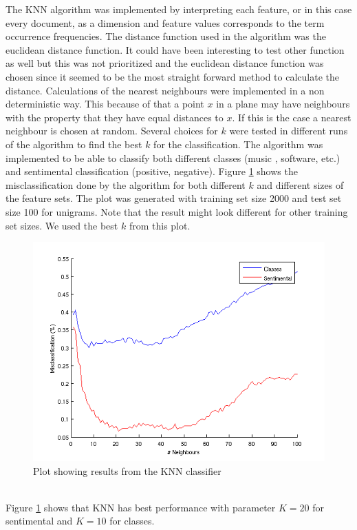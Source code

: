 The KNN algorithm was implemented by interpreting each feature, or in this case
every document, as a dimension and feature values corresponds to the term
occurrence frequencies. The distance function used in the algorithm was the
euclidean distance function. It could have been interesting to test other
function as well but this was not prioritized and the euclidean distance function
was chosen since it seemed to be the most straight forward method to calculate
the distance. Calculations
of the nearest neighbours were implemented in a non deterministic way. This
because of that a point $x$ in a plane may have neighbours with the property
that they have equal distances to $x$. If this is the case a nearest neighbour
is chosen at random. Several choices for $k$ were tested in different runs of
the algorithm to find the best $k$ for the classification. The algorithm was
implemented to be able to classify both different classes (music , software,
etc.) and sentimental classification (positive, negative). Figure
\ref{fig:KNNplot} shows the misclassification done by the algorithm for both
different $k$ and different sizes of the feature sets. The plot was generated
with training set size 2000 and test set size 100 for unigrams. Note that the
result might look different for other training set sizes. We used the best $k$
from this plot.
\begin{figure}[h!]
\centering
\includegraphics[scale=0.6]{../Plottar/knn_2000words_testdata100_unigram}
\caption{Plot showing results from the KNN classifier}
\label{fig:KNNplot}
\end{figure}\\
Figure \ref{fig:KNNplot} shows that KNN has best performance with parameter $K = 20$ for sentimental and $K = 10$ for classes.

